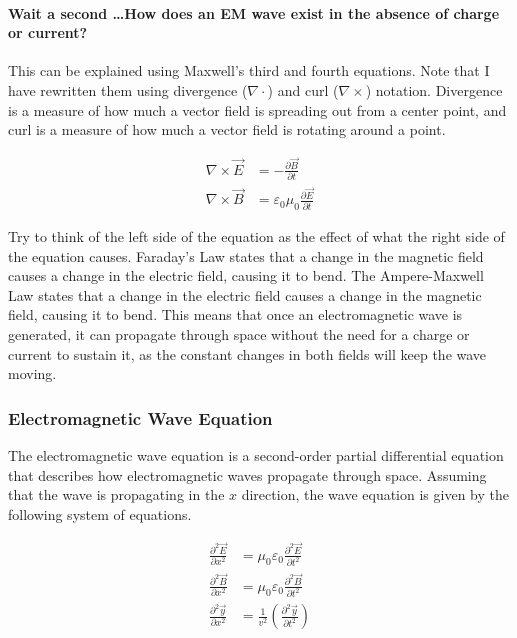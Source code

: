 \pagebreak

\paragraph{Wait a second \ldots How does an EM wave exist in the absence of charge or current?}
This can be explained using Maxwell's third and fourth equations. Note that I have rewritten them using divergence ($\nabla \cdot$) and curl ($\nabla \times$) notation.
Divergence is a measure of how much a vector field is spreading out from a center point, and curl is a measure of how much a vector field is rotating around a point.

\begin{align*}
    \nabla \times \vec{E} &= -\frac{\partial\vec{B}}{\partial t}\\
    \nabla \times \vec{B} &= \varepsilon_0\mu_0\frac{\partial \vec{E}}{\partial t}
\end{align*}

Try to think of the left side of the equation as the effect of what the right side of the equation causes. Faraday's Law states that a change in the magnetic field causes
a change in the electric field, causing it to bend. The Ampere-Maxwell Law states that a change in the electric field causes a change in the magnetic field, causing it to bend.
This means that once an electromagnetic wave is generated, it can propagate through space without the need for a charge or current to sustain it, as the constant changes in both
fields will keep the wave moving.

\subsubsection*{Electromagnetic Wave Equation}
The electromagnetic wave equation is a second-order partial differential equation that describes how electromagnetic waves propagate through space.
Assuming that the wave is propagating in the $x$ direction, the wave equation is given by the following system of equations.

\begin{align*}
    \frac{\partial^2\vec{E}}{\partial x^2} &= \mu_0\varepsilon_0\frac{\partial^2\vec{E}}{\partial t^2}\\
    \frac{\partial^2\vec{B}}{\partial x^2} &= \mu_0\varepsilon_0\frac{\partial^2\vec{B}}{\partial t^2}\\
    \frac{\partial^2 \vec{y}}{\partial x^2} &= \frac{1}{v^2}(\frac{\partial^2 \vec{y}}{\partial t^2})
\end{align*}
    
